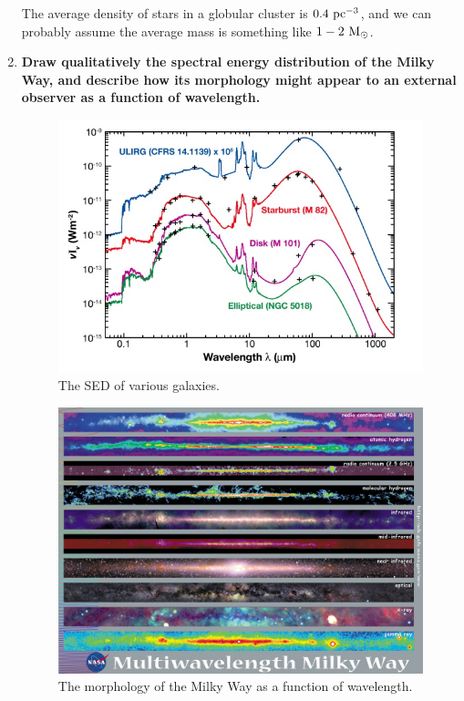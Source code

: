 \begin{enumerate}
      The average density of stars in a globular cluster is $0.4~{\rm pc}^{-3}$, and we can probably assume the average mass is something like $1-2~{\rm M}_\odot$.

\item \textbf{Draw qualitatively the spectral energy distribution of the Milky Way, and describe
      how its morphology might appear to an external observer as a function of wavelength.}
      
    \begin{figure}[!ht]
    \centering
    \includegraphics[width=\textwidth]{galaxy_sed.jpg}
    \caption{The SED of various galaxies.}
    \label{fig:galaxy_sed}
    \end{figure}

    \begin{figure}[!ht]
    \centering
    \includegraphics[width=\textwidth]{MW_morphology.jpg}
    \caption{The morphology of the Milky Way as a function of wavelength.}
    \label{fig:MW_morphology}
    \end{figure}


\end{enumerate}

